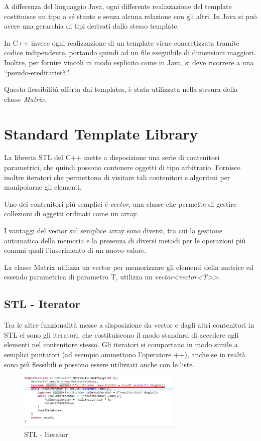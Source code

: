A differenza del linguaggio Java, ogni differente realizzazione del template costituisce un tipo
a sé stante e senza alcuna relazione con gli altri. In Java si può avere una gerarchia di tipi
derivati dallo stesso template.

In C++ invece ogni realizzazione di un template viene concretizzata tramite codice
indipendente, portando quindi ad un file eseguibile di dimensioni maggiori. Inoltre, per fornire
vincoli in modo esplicito come in Java, si deve ricorrere a una “pseudo-ereditarietà”.

Questa flessibilità offerta dai templates, è stata utilizzata nella stesura della classe \textit{Matrix}.

\section{Standard Template Library}
La libreria STL del C++ mette a disposizione una serie di contenitori parametrici, che quindi
possono contenere oggetti di tipo arbitrario. Fornisce inoltre iteratori che permettono di visitare
tali contenitori e algoritmi per manipolarne gli elementi.

Uno dei contenitori più semplici è \textit{vector}, una classe che permette di gestire collezioni di oggetti ordinati come un array.

I vantaggi del vector sul semplice array sono diversi, tra cui la gestione automatica della
memoria e la presenza di diversi metodi per le operazioni più comuni quali l'inserimento di un
nuovo valore.

La classe Matrix utilizza un vector per memorizzare gli elementi della matrice ed essendo
parametrica di parametro T, utilizza un \textit{vector<vector<T>>}.
\subsection{STL - Iterator}
Tra le altre funzionalità messe a disposizione da vector e dagli altri contenitori in STL ci sono gli
iteratori, che costituiscono il modo standard di accedere agli elementi nel contenitore stesso. Gli
iteratori si comportano in modo simile a semplici puntatori (ad esempio ammettono l'operatore ++),
anche se in realtà sono più flessibili e possono essere utilizzati anche con le liste.

\begin{figure}[h]
	\centering
	\includegraphics[width=0.7\textwidth]{Immagini/Stl_Iterator.png}
	\caption{STL - Iterator}
	\label{fig:Iterator}
\end{figure}

